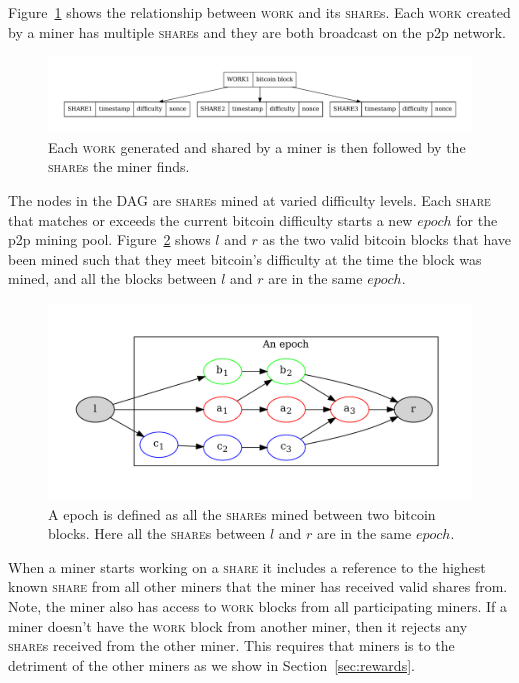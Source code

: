 \documentclass{article}
\begin{document}
Figure~\ref{fig:work-share} shows the relationship between
\textsc{work} and its \textsc{share}s. Each \textsc{work} created by a
miner has multiple \textsc{share}s and they are both broadcast on the
p2p network.

\begin{figure}[h]
  \begin{center}
    \includegraphics[width=1.0\textwidth]{work-share}
    \caption{Each \textsc{work} generated and shared by a miner is then
      followed by the \textsc{share}s the miner finds.}\label{fig:work-share}
    \end{center}
\end{figure}

The nodes in the DAG are \textsc{share}s mined at varied difficulty
levels. Each \textsc{share} that matches or exceeds the current
bitcoin difficulty starts a new $epoch$ for the p2p mining
pool. Figure~\ref{fig:epoch} shows $l$ and $r$ as the two valid
bitcoin blocks that have been mined such that they meet bitcoin's
difficulty at the time the block was mined, and all the blocks between
$l$ and $r$ are in the same $epoch$.

\begin{figure}[h]
  \includegraphics[width=1.0\textwidth]{epoch}
  \caption{A epoch is defined as all the \textsc{share}s mined between two
    bitcoin blocks. Here all the \textsc{share}s between $l$ and $r$ are in
    the same $epoch$.}\label{fig:epoch}
\end{figure}

When a miner starts working on a \textsc{share} it includes a
reference to the highest known \textsc{share} from all other miners
that the miner has received valid shares from. Note, the miner also
has access to \textsc{work} blocks from all participating miners. If a
miner doesn't have the \textsc{work} block from another miner, then it
rejects any \textsc{share}s received from the other miner. This
requires that miners is to the detriment of the other miners as we
show in Section~\ref{sec:rewards}.
\end{document}

